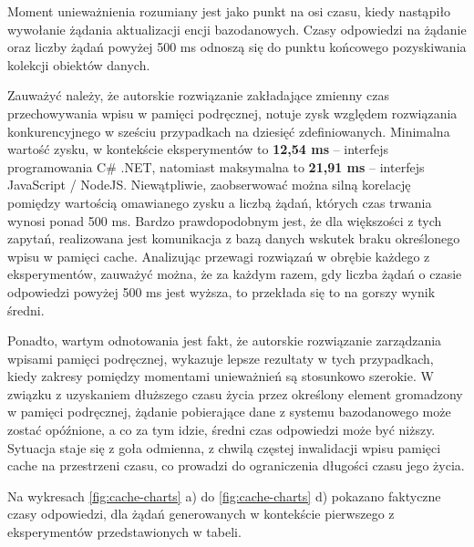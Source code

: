 Moment unieważnienia rozumiany jest jako punkt na osi czasu, kiedy nastąpiło wywołanie żądania aktualizacji encji bazodanowych. Czasy odpowiedzi na żądanie oraz liczby żądań powyżej 500 ms odnoszą się do punktu końcowego pozyskiwania kolekcji obiektów danych.

Zauważyć należy, że autorskie rozwiązanie zakładające zmienny czas przechowywania wpisu w pamięci podręcznej, notuje zysk względem rozwiązania konkurencyjnego w sześciu przypadkach na dziesięć zdefiniowanych. Minimalna wartość zysku, w kontekście eksperymentów to \textbf{12,54 ms} -- interfejs programowania C\# .NET, natomiast maksymalna to \textbf{21,91 ms} -- interfejs JavaScript / NodeJS. Niewątpliwie, zaobserwować można silną korelację pomiędzy wartością omawianego zysku a liczbą żądań, których czas trwania wynosi ponad 500 ms. Bardzo prawdopodobnym jest, że dla większości z tych zapytań, realizowana jest komunikacja z bazą danych wskutek braku określonego wpisu w pamięci cache. Analizując przewagi rozwiązań w obrębie każdego z eksperymentów, zauważyć można, że za każdym razem, gdy liczba żądań o czasie odpowiedzi powyżej 500 ms jest wyższa, to przekłada się to na gorszy wynik średni.

Ponadto, wartym odnotowania jest fakt, że autorskie rozwiązanie zarządzania wpisami pamięci podręcznej, wykazuje lepsze rezultaty w tych przypadkach, kiedy zakresy pomiędzy momentami unieważnień są stosunkowo szerokie. W związku z uzyskaniem dłuższego czasu życia przez określony element gromadzony w pamięci podręcznej, żądanie pobierające dane z systemu bazodanowego może zostać opóźnione, a co za tym idzie, średni czas odpowiedzi może być niższy. Sytuacja staje się z goła odmienna, z chwilą częstej inwalidacji wpisu pamięci cache na przestrzeni czasu, co prowadzi do ograniczenia długości czasu jego życia.

Na wykresach \ref{fig:cache-charts} a) do \ref{fig:cache-charts} d) pokazano faktyczne czasy odpowiedzi, dla żądań generowanych w kontekście pierwszego z eksperymentów przedstawionych w tabeli.

